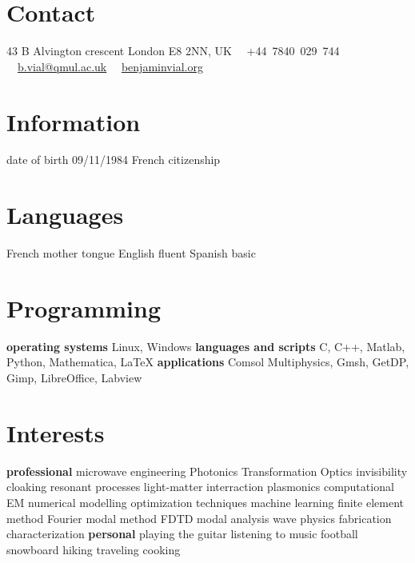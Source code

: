 \documentclass[]{cv} %
\begin{document}


\begin{aside} %
\section{Contact}
43 B Alvington crescent
London E8 2NN, UK
\faPhone~~+44~7840~029~744
\faEnvelope~~\href{mailto:b.vial@qmul.ac.uk}{b.vial@qmul.ac.uk}
\faUser~~\href{www.benjaminvial.org}{benjaminvial.org}
\section{Information}
date of birth 09/11/1984
French citizenship
\section{Languages}
French mother tongue
English fluent
Spanish basic
\section{Programming}
\textbf{operating systems}
Linux, Windows
\textbf{languages and scripts}
C, C++, Matlab, Python, Mathematica, \LaTeX
\textbf{applications}
Comsol Multiphysics, Gmsh, GetDP, Gimp, LibreOffice, Labview
\section{Interests}
\textbf{professional}
microwave engineering
Photonics
Transformation Optics
invisibility cloaking
resonant processes
light-matter interraction
plasmonics
computational EM
numerical modelling
optimization techniques
machine learning
finite element method
Fourier modal method
FDTD
modal analysis
wave physics
fabrication
characterization
\textbf{personal}
playing the guitar
listening to music
football
snowboard
hiking
traveling
cooking
\end{aside}


\end{document}
